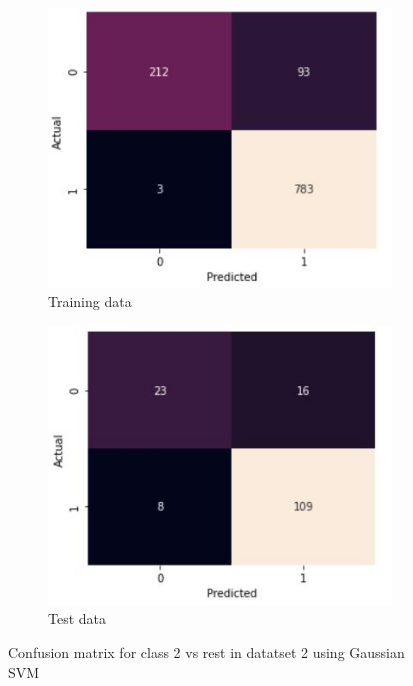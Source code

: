 \documentclass[11pt]{article}
\begin{document}
\begin{figure}[h]
\centering
	\begin{subfigure}[b]{0.45\textwidth}
	\centering
	\includegraphics[scale=0.5]{dataset2_gauss_2_cm_train.jpg}
	\caption{Training data}
	\label{fig:fig3.2.3.1}
	\end{subfigure}
	\begin{subfigure}[b]{0.45\textwidth}
	\centering
	\includegraphics[scale=0.5]{dataset2_gauss_2_cm_test.jpg}
	\caption{Test data}
	\label{fig:fig3.2.3.2}
	\end{subfigure}
\caption{Confusion matrix for class 2 vs rest in datatset 2 using Gaussian SVM}
\label{fig:fig3.2.3}
\end{figure}
\end{document}
